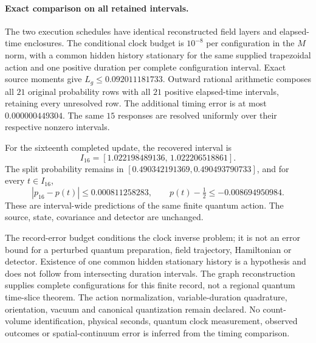 \paragraph{Exact comparison on all retained intervals.}
The two execution schedules have identical reconstructed field layers
and elapsed-time enclosures. The conditional clock budget is
$10^{-8}$ per configuration in the $M$ norm, with a common hidden
history stationary for the same supplied trapezoidal action and one
positive duration per complete configuration interval.
Exact source moments give $L_g\le0.092011181733$.
Outward rational arithmetic composes all $21$ original probability rows
with all $21$ positive elapsed-time intervals, retaining every unresolved
row. The additional timing error is at most $0.000000449304$.
The same $15$ responses are resolved uniformly over their
respective nonzero intervals.

For the sixteenth completed update, the recovered interval is
\[
 I_{16}=[1.022198489136,\,1.022206518861].
\]
The split probability remains in
$[0.490342191369,0.490493790733]$, and for every $t\in I_{16}$,
\[
 |p_{16}-p(t)|\le0.000811258283,\qquad
 p(t)-\tfrac12\le-0.008694950984.
\]
These are interval-wide predictions of the same finite quantum action.
The source, state, covariance and detector are unchanged.

The record-error budget conditions the clock inverse problem; it is not
an error bound for a perturbed quantum preparation, field trajectory,
Hamiltonian or detector. Existence of one common hidden stationary history
is a hypothesis and does not follow from intersecting duration intervals.
The graph reconstruction supplies complete configurations for this finite
record, not a regional quantum time-slice theorem. The action normalization,
variable-duration quadrature, orientation, vacuum and canonical
quantization remain declared. No count-volume identification, physical
seconds, quantum clock measurement, observed outcomes or spatial-continuum
error is inferred from the timing comparison.
